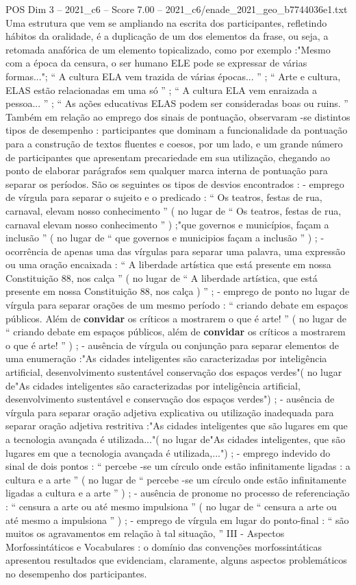 \begin{textsample}{POS Dim 3 – 2021\_c6 – Score 7.00 – 2021\_c6/enade\_2021\_geo\_b7744036e1.txt}
Uma estrutura que vem se ampliando na escrita dos participantes, refletindo hábitos da oralidade, é a duplicação de um dos elementos da frase, ou seja, a retomada anafórica de um elemento topicalizado, como por exemplo :"Mesmo com a época da censura, o ser humano ELE pode se expressar de várias formas..."; “ A cultura ELA vem trazida de várias épocas... ” ; “ Arte e cultura, ELAS estão relacionadas em uma só ” ; “ A cultura ELA vem enraizada a pessoa... ” ; “ As ações educativas ELAS podem ser consideradas boas ou ruins. ” Também em relação ao emprego dos sinais de pontuação, observaram -se distintos tipos de desempenho : participantes que dominam a funcionalidade da pontuação para a construção de textos fluentes e coesos, por um lado, e um grande número de participantes que apresentam precariedade em sua utilização, chegando ao ponto de elaborar parágrafos sem qualquer marca interna de pontuação para separar os períodos.
São os seguintes os tipos de desvios encontrados : - emprego de vírgula para separar o sujeito e o predicado : “ Os teatros, festas de rua, carnaval, elevam nosso conhecimento ” ( no lugar de “ Os teatros, festas de rua, carnaval elevam nosso conhecimento ” ) ;"que governos e municípios, façam a inclusão ” ( no lugar de “ que governos e municipios façam a inclusão ” ) ; - ocorrência de apenas uma das vírgulas para separar uma palavra, uma expressão ou uma oração encaixada : “ A liberdade artística que está presente em nossa Constituição 88, nos calça ” ( no lugar de “ A liberdade artística, que está presente em nossa Constituição 88, nos calça ) ” ; - emprego de ponto no lugar de vírgula para separar orações de um mesmo período : “ criando debate em espaços públicos.
Além de \textbf{convidar} os críticos a mostrarem o que é arte! ” ( no lugar de “ criando debate em espaços públicos, além de \textbf{convidar} os críticos a mostrarem o que é arte! ” ) ; - ausência de vírgula ou conjunção para separar elementos de uma enumeração :"As cidades inteligentes são caracterizadas por inteligência artificial, desenvolvimento sustentável conservação dos espaços verdes"( no lugar de"As cidades inteligentes são caracterizadas por inteligência artificial, desenvolvimento sustentável e conservação dos espaços verdes") ; - ausência de vírgula para separar oração adjetiva explicativa ou utilização inadequada para separar oração adjetiva restritiva :"As cidades inteligentes que são lugares em que a tecnologia avançada é utilizada..."( no lugar de"As cidades inteligentes, que são lugares em que a tecnologia avançada é utilizada,...") ; - emprego indevido do sinal de dois pontos : “ percebe -se um círculo onde estão infinitamente ligadas : a cultura e a arte ” ( no lugar de “ percebe -se um círculo onde estão infinitamente ligadas a cultura e a arte ” ) ; - ausência de pronome no processo de referenciação : “ censura a arte ou até mesmo impulsiona ” ( no lugar de “ censura a arte ou até mesmo a impulsiona ” ) ; - emprego de vírgula em lugar do ponto-final : “ são muitos os agravamentos em relação à tal situação, ” III - Aspectos Morfossintáticos e Vocabulares : o domínio das convenções morfossintáticas apresentou resultados que evidenciam, claramente, alguns aspectos problemáticos no desempenho dos participantes.

\end{textsample}
